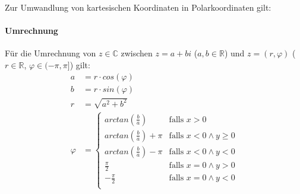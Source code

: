 \documentclass[a4paper, 11pt, accentcolor = tud3b]{tudreport}
\begin{document}
                    Zur Umwandlung von kartesischen Koordinaten in Polarkoordinaten gilt:

                \paragraph{Umrechnung}
                    Für die Umrechnung von $ z \in \mathbb{C} $ zwischen $ z = a + bi $ ($ a, b \in \mathbb{R} $) und $ z = (r, \varphi) $ ($ r \in \mathbb{R} $, $ \varphi \in (-\pi, \pi] $) gilt:
                    \begin{align*}
                        a &= r \cdot cos(\varphi) \\
                        b &= r \cdot sin(\varphi) \\
                        r &= \sqrt{a ^ 2 + b ^ 2} \\
                        \varphi &=
                        \begin{cases}
                            arctan(\frac{b}{a}) & \text{falls } x > 0 \\
                            arctan(\frac{b}{a}) + \pi & \text{falls } x < 0 \land y \geq 0 \\
                            arctan(\frac{b}{a}) - \pi & \text{falls } x < 0 \land y < 0 \\
                            \frac{\pi}{2} & \text{falls } x = 0 \land y > 0 \\
                            -\frac{\pi}{2} & \text{falls } x = 0 \land y < 0 \\
                        \end{cases}
                    \end{align*}
\end{document}
